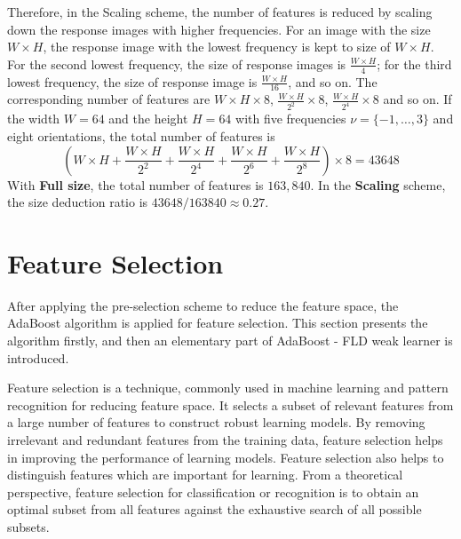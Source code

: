 Therefore, in the \mbox{Scaling} scheme, the number of features is reduced by scaling down the response images with higher frequencies. For an image with the size $W\times H$, the response image with the lowest frequency is kept to size of $W\times H$. For the second lowest frequency, the size of response images is $\frac{W\times H}{4}$; for the third lowest frequency, the size of response image is $\frac{W\times H}{16}$, and so on. The corresponding number of features are  $W\times H\times 8$, $\frac{W\times H}{2^2}\times 8$, $\frac{W\times H}{2^4}\times 8$ and so on. If the width $W=64$ and the height $H=64$ with five frequencies $\nu=\{-1,\ldots,3\}$ and eight orientations, the total number of features is
\begin{displaymath}
 (W\times H+ \frac{W\times H}{2^2} + \frac{W\times H}{2^4} + \frac{W\times H}{2^6}+ \frac{W\times H}{2^8})\times 8= 43648
\end{displaymath}
With \textbf{Full size}, the total number of features is $163,840$. In the \textbf{Scaling} scheme, the size deduction ratio is $43648/163840\approx 0.27$.

\section{Feature Selection}
\label{sec:featureselection}
After applying the pre-selection scheme to reduce the feature space, the AdaBoost algorithm is applied for feature selection. This section presents the algorithm firstly, and then an elementary part of AdaBoost - FLD weak learner is introduced. 

Feature selection is a technique, commonly used in machine learning and pattern recognition for reducing feature space. It selects a subset of relevant features from a large number of features to construct robust learning models. By removing irrelevant and redundant features from the training data, feature selection helps in improving the performance of learning models. Feature selection also helps to distinguish features which are important for learning. From a theoretical perspective, feature selection for classification or recognition is to obtain an optimal subset from all features against the exhaustive search of all possible subsets.

